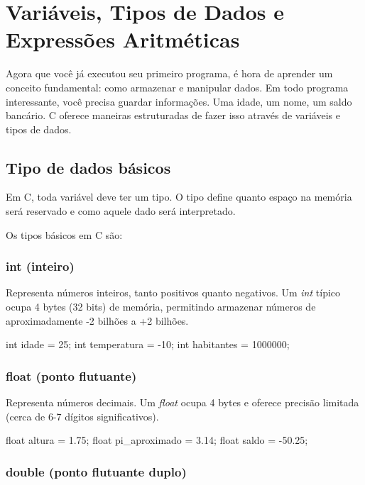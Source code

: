 
\chapter{Variáveis, Tipos de Dados e Expressões Aritméticas}

Agora que você já executou seu primeiro programa, é hora de aprender um conceito fundamental: como armazenar e manipular dados. Em todo programa interessante, você precisa guardar informações. Uma idade, um nome, um saldo bancário. C oferece maneiras estruturadas de fazer isso através de variáveis e tipos de dados.

\section{Tipo de dados básicos}

Em C, toda variável deve ter um tipo. O tipo define quanto espaço na memória será reservado e como aquele dado será interpretado.

Os tipos básicos em C são:

\subsection{int (inteiro)}

Representa números inteiros, tanto positivos quanto negativos. Um \textit{int} típico ocupa 4 bytes (32 bits) de memória, permitindo armazenar números de aproximadamente -2 bilhões a +2 bilhões.

\begin{ccode}
  int idade = 25;
  int temperatura = -10;
  int habitantes = 1000000;
\end{ccode}

\subsection{float (ponto flutuante)}

Representa números decimais. Um \textit{float} ocupa 4 bytes e oferece precisão limitada (cerca de 6-7 dígitos significativos).

\begin{ccode}
  float altura = 1.75;
  float pi_aproximado = 3.14;
  float saldo = -50.25;
\end{ccode}

\subsection{double (ponto flutuante duplo)}

